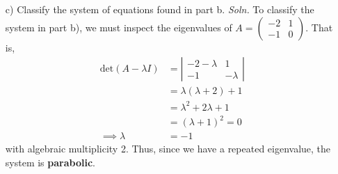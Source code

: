 \documentclass{article}
\begin{document}
\begin{itemize}
\begin{itemize}
        \item[c)] Classify the system of equations found in part b.
        \newline\newline
        \textit{Soln.} To classify the system in part b), we must inspect the eigenvalues of $A = \begin{pmatrix}
            -2 & 1\\
            -1 & 0
        \end{pmatrix}$. That is,
        \begin{align*}
            \text{det}(A - \lambda I) &= \left|\begin{matrix}
                -2 - \lambda & 1\\
                -1 & -\lambda
            \end{matrix}\right|\\
            &= \lambda(\lambda + 2) + 1\\
            &= \lambda^2 + 2\lambda + 1\\
            &= (\lambda + 1)^2 = 0\\
            \implies \lambda &= -1
        \end{align*}
        with algebraic multiplicity 2. Thus, since we have a repeated eigenvalue, the system is \textbf{parabolic}.
        
        
    \end{itemize}
    \pagebreak


\end{itemize}
\end{document}
